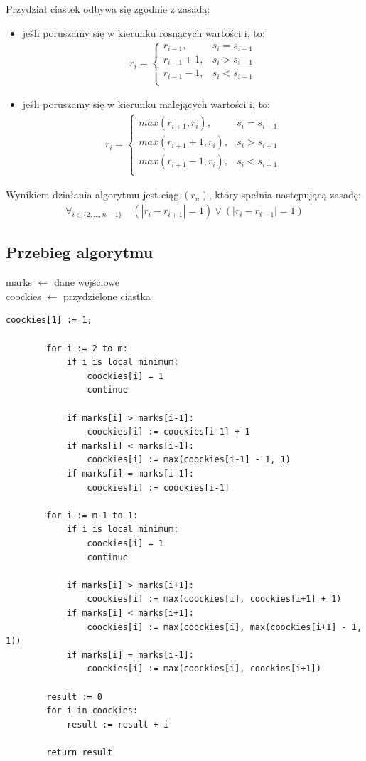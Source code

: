 \documentclass{article}
\begin{document}
	Przydział ciastek odbywa się zgodnie z zasadą:
	\begin{itemize}
		\item jeśli poruszamy się w kierunku rosnących wartości i, to:
			\begin{align*}
				r_i  =
				\begin{cases}
					r_{i-1}, & s_{i} = s_{i-1} \\
					r_{i-1} + 1, & s_{i} > s_{i-1} \\
					r_{i-1} - 1, & s_{i} < s_{i-1} \\
				\end{cases}
			\end{align*}

		\item jeśli poruszamy się w kierunku malejących wartości i, to:
			\begin{align*}
				r_i  =
				\begin{cases}
					max(r_{i+1}, r_{i}), & s_{i} = s_{i+1} \\
					max(r_{i+1} + 1, r_{i}), & s_{i} > s_{i+1} \\
					max(r_{i+1} - 1, r_{i}), & s_{i} < s_{i+1} \\
				\end{cases}
			\end{align*}
	\end{itemize}

	Wynikiem działania algorytmu jest ciąg $(r_{n})$, który spełnia następującą zasadę:
	\begin{align*}
		\forall_{i\in \{2, \ldots, n-1\}}\hspace{1em} (|r_i - r_{i+1}| = 1) \lor (|r_i - r_{i-1}| = 1)
	\end{align*}

	\newpage
	\subsection{Przebieg algorytmu}
	marks $\leftarrow$ dane wejściowe \\
	coockies $\leftarrow$ przydzielone ciastka

	\begin{lstlisting}[tabsize=2]
		coockies[1] := 1;

		for i := 2 to m:
			if i is local minimum:
				coockies[i] = 1
				continue

			if marks[i] > marks[i-1]:
				coockies[i] := coockies[i-1] + 1
			if marks[i] < marks[i-1]:
				coockies[i] := max(coockies[i-1] - 1, 1)
			if marks[i] = marks[i-1]:
				coockies[i] := coockies[i-1]

		for i := m-1 to 1:
			if i is local minimum:
				coockies[i] = 1
				continue

			if marks[i] > marks[i+1]:
				coockies[i] := max(coockies[i], coockies[i+1] + 1)
			if marks[i] < marks[i+1]:
				coockies[i] := max(coockies[i], max(coockies[i+1] - 1, 1))
			if marks[i] = marks[i-1]:
				coockies[i] := max(coockies[i], coockies[i+1])

		result := 0
		for i in coockies:
			result := result + i

		return result
	\end{lstlisting}
\end{document}
